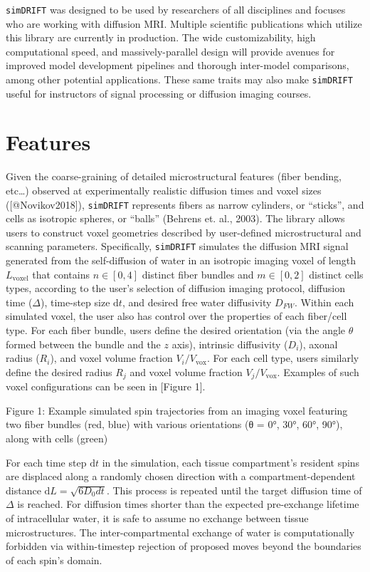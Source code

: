 \documentclass[
]{article}
\begin{document}
\texttt{simDRIFT} was designed to be used by researchers of all
disciplines and focuses who are working with diffusion MRI. Multiple
scientific publications which utilize this library are currently in
production. The wide customizability, high computational speed, and
massively-parallel design will provide avenues for improved model
development pipelines and thorough inter-model comparisons, among other
potential applications. These same traits may also make
\texttt{simDRIFT} useful for instructors of signal processing or
diffusion imaging courses.

\hypertarget{features}{%
\section{Features}\label{features}}

Given the coarse-graining of detailed microstructural features (fiber
bending, etc\ldots) observed at experimentally realistic diffusion times
and voxel sizes ({[}@Novikov2018{]}), \texttt{simDRIFT} represents
fibers as narrow cylinders, or ``sticks'', and cells as isotropic
spheres, or ``balls'' (Behrens et. al., 2003). The library allows users
to construct voxel geometries described by user-defined microstructural
and scanning parameters. Specifically, \texttt{simDRIFT} simulates the
diffusion MRI signal generated from the self-diffusion of water in an
isotropic imaging voxel of length \(L_{\mathrm{voxel}}\) that contains
\(n \in [0,4]\) distinct fiber bundles and \(m \in [0,2]\) distinct
cells types, according to the user's selection of diffusion imaging
protocol, diffusion time (\(\Delta\)), time-step size \(\mathrm{d}t\),
and desired free water diffusivity \(D_{FW}\). Within each simulated
voxel, the user also has control over the properties of each fiber/cell
type. For each fiber bundle, users define the desired orientation (via
the angle \(\theta\) formed between the bundle and the \(z\) axis),
intrinsic diffusivity (\(D_{i}\)), axonal radius (\(R_{i}\)), and voxel
volume fraction \(V_{i}/V_{\mathrm{vox}}\). For each cell type, users
similarly define the desired radius \(R_{j}\) and voxel volume fraction
\(V_{j}/V_{\mathrm{vox}}\). Examples of such voxel configurations can be
seen in {[}Figure 1{]}.

Figure 1: Example simulated spin trajectories from an imaging voxel
featuring two fiber bundles (red, blue) with various orientations (θ =
0°, 30°, 60°, 90°), along with cells (green)

For each time step \(\mathrm{d}t\) in the simulation, each tissue
compartment's resident spins are displaced along a randomly chosen
direction with a compartment-dependent distance
\(\mathrm{d}L = \sqrt{6D_{0}dt}\). This process is repeated until the
target diffusion time of \(\Delta\) is reached. For diffusion times
shorter than the expected pre-exchange lifetime of intracellular water,
it is safe to assume no exchange between tissue microstructures. The
inter-compartmental exchange of water is computationally forbidden via
within-timestep rejection of proposed moves beyond the boundaries of
each spin's domain.
\end{document}
